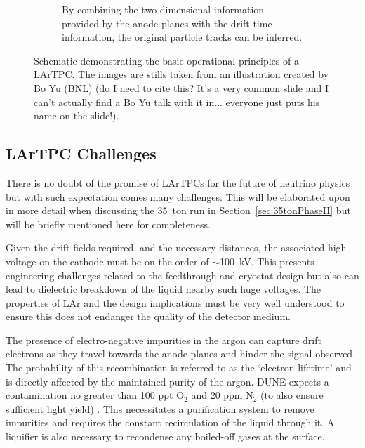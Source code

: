 \begin{figure}[p]
\begin{subfigure}[t]{0.48\linewidth}
    \caption{By combining the two dimensional information provided by the anode planes with the drift time information, the original particle tracks can be inferred.}
    \label{fig:LArTPCOperation4}
  \end{subfigure}
  \caption[Schematic demonstrating the basic operational principles of a LArTPC.]{Schematic demonstrating the basic operational principles of a LArTPC.  The images are stills taken from an illustration created by Bo Yu (BNL) {\color{red}(do I need to cite this?  It's a very common slide and I can't actually find a Bo Yu talk with it in... everyone just puts his name on the slide!)}.}
  \label{fig:LArTPCOperation}
\end{figure}

\subsection{LArTPC Challenges}\label{sec:LArTPCChallenges}

There is no doubt of the promise of LArTPCs for the future of neutrino physics but with such expectation comes many challenges.  This will be elaborated upon in more detail when discussing the 35~ton run in Section~\ref{sec:35tonPhaseII} but will be briefly mentioned here for completeness.

Given the drift fields required, and the necessary distances, the associated high voltage on the cathode must be on the order of $\sim$100~kV.  This presents engineering challenges related to the feedthrough and cryostat design but also can lead to dielectric breakdown of the liquid nearby such huge voltages.  The properties of LAr and the design implications must be very well understood to ensure this does not endanger the quality of the detector medium.

The presence of electro-negative impurities in the argon can capture drift electrons as they travel towards the anode planes and hinder the signal observed.  The probability of this recombination is referred to as the `electron lifetime' and is directly affected by the maintained purity of the argon.  DUNE expects a contamination no greater than 100 ppt O$_2$ and 20 ppm N$_2$ (to also ensure sufficient light yield) \cite{DUNECDR4}.  This necessitates a purification system to remove impurities and requires the constant recirculation of the liquid through it.  A liquifier is also necessary to recondense any boiled-off gases at the surface.

